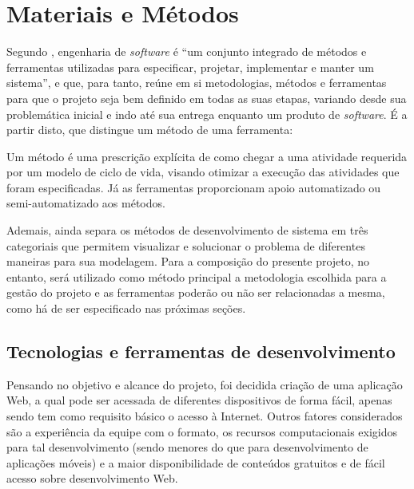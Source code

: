 \section{Materiais e Métodos}
Segundo , engenharia de \textsl{software} é ``um conjunto integrado de métodos e ferramentas utilizadas para especificar, projetar, implementar e manter um sistema'', e que, para tanto, reúne em si metodologias, métodos e ferramentas para que o projeto seja bem definido em todas as suas etapas, variando desde sua problemática inicial e indo até sua entrega enquanto um produto de \textsl{software}. É a partir disto, que  distingue um método de uma ferramenta:

\begin{citacao}
Um método é uma prescrição explícita de como chegar a uma atividade requerida por um modelo de ciclo de vida, visando otimizar a execução das atividades que foram especificadas. Já as ferramentas proporcionam apoio automatizado ou semi-automatizado aos métodos\cite{Junior:2010}.
\end{citacao}

Ademais,  ainda separa os métodos de desenvolvimento de sistema em três categoriais que permitem visualizar e solucionar o problema de diferentes maneiras para sua modelagem. Para a composição do presente projeto, no entanto, será utilizado como método principal a metodologia escolhida para a gestão do projeto e as ferramentas poderão ou não ser relacionadas a mesma, como há de ser especificado nas próximas seções.

\subsection{Tecnologias e ferramentas de desenvolvimento}
Pensando no objetivo e alcance do projeto, foi decidida criação de uma aplicação Web, a qual pode ser acessada de diferentes dispositivos de forma fácil, apenas sendo tem como requisito básico o acesso à Internet. Outros fatores considerados são a experiência da equipe com o formato, os recursos computacionais exigidos para tal desenvolvimento (sendo menores do que para desenvolvimento de aplicações móveis) e a maior disponibilidade de conteúdos gratuitos e de fácil acesso sobre desenvolvimento Web.

